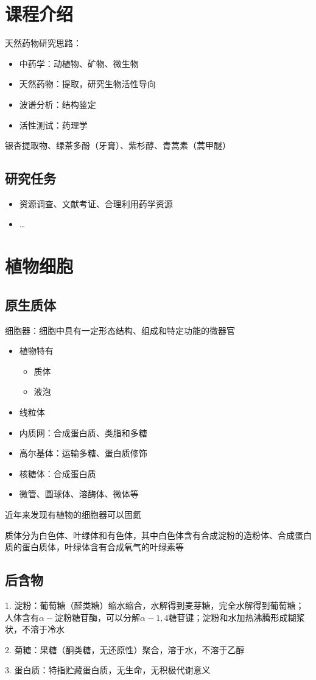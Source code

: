 \section{课程介绍}%
\label{sec:课程介绍}
天然药物研究思路：
\begin{itemize}
    \item 中药学：动植物、矿物、微生物
    \item 天然药物：提取，研究生物活性导向
    \item 波谱分析：结构鉴定
    \item 活性测试：药理学
    
\end{itemize}
\begin{eg}
    银杏提取物、绿茶多酚（牙膏）、紫杉醇、青蒿素（蒿甲醚）
\end{eg}
\subsection{研究任务}%
\label{sub:研究任务}
\begin{itemize}
    \item 资源调查、文献考证、合理利用药学资源
    \item \ldots 
    
\end{itemize}
\section{植物细胞}%
\label{sec:植物细胞}
\subsection{原生质体}%
\label{sub:原生质体}
\begin{defi}
    细胞器：细胞中具有一定形态结构、组成和特定功能的微器官
\end{defi}
\begin{itemize}
    \item 植物特有
        \begin{itemize}
            \item 质体
            \item 液泡
        \end{itemize}
    \item 线粒体
    \item 内质网：合成蛋白质、类脂和多糖
    \item 高尔基体：运输多糖、蛋白质修饰
    \item 核糖体：合成蛋白质
    \item 微管、圆球体、溶酶体、微体等
    
\end{itemize}
\begin{notation}
    近年来发现有植物的细胞器可以固氮
\end{notation}
质体分为白色体、叶绿体和有色体，其中白色体含有合成淀粉的造粉体、合成蛋白质的蛋白质体，叶绿体含有合成氧气的叶绿素等

\subsection{后含物}%
\label{sub:后含物}
1. 淀粉：葡萄糖（醛类糖）缩水缩合，水解得到麦芽糖，完全水解得到葡萄糖；人体含有$\alpha-$淀粉糖苷酶，可以分解$\alpha-1,4$糖苷键；淀粉和水加热沸腾形成糊浆状，不溶于冷水

2. 菊糖：果糖（酮类糖，无还原性）聚合，溶于水，不溶于乙醇

3. 蛋白质：特指贮藏蛋白质，无生命，无积极代谢意义
